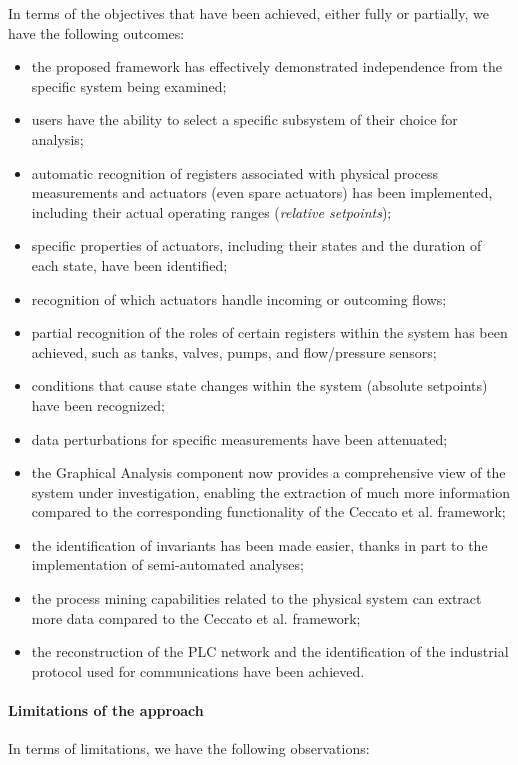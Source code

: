 In terms of the objectives that have been achieved, either fully or partially, we have the following outcomes:

\begin{itemize}
	\item the proposed framework has effectively demonstrated independence from the specific system being examined;
	\item users have the ability to select a specific subsystem of their choice for analysis;
	\item automatic recognition of registers associated with physical process measurements and actuators (even spare actuators) has been implemented, including their actual operating ranges (\textit{relative setpoints});
	\item specific properties of actuators, including their states and the duration of each state, have been identified;
	\item recognition of which actuators handle incoming or outcoming flows;
	\item partial recognition of the roles of certain registers within the system has been achieved, such as tanks, valves, pumps, and flow/pressure sensors;
	\item conditions that cause state changes within the system (absolute setpoints) have been recognized;
	\item data perturbations for specific measurements have been attenuated;
	\item the Graphical Analysis component now provides a comprehensive view of the system under investigation, enabling the extraction of much more information compared to the corresponding functionality of the Ceccato et al. framework;
	\item the identification of invariants has been made easier, thanks in part to the implementation of semi-automated analyses;
	\item the process mining capabilities related to the physical system can extract more data compared to the Ceccato et al. framework;
	\item the reconstruction of the PLC network and the identification of the industrial protocol used for communications have been achieved.
\end{itemize}

\paragraph{Limitations of the approach} 
\label{par:7_limitations}
In terms of limitations, we have the following observations:

